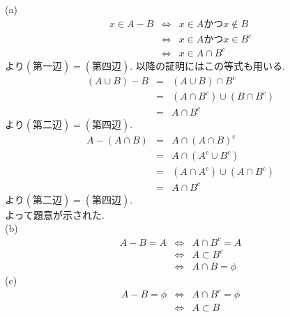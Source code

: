 \documentclass{jsarticle}
\begin{document}
\subsection{}	%
\noindent
(a)\\
\begin{eqnarray*}
	x \in A - B
	&\Leftrightarrow& x \in A かつ x \notin B\\
	&\Leftrightarrow& x \in A かつ x \in B^c\\
	&\Leftrightarrow& x \in A \cap B^c
\end{eqnarray*}
より$(第一辺) = (第四辺)$. 以降の証明にはこの等式も用いる.
\begin{eqnarray*}
	(A \cup B) - B
	&=& (A \cup B) \cap B^c\\
	&=& (A \cap B^c) \cup (B \cap B^c)\\
	&=& A \cap B^c
\end{eqnarray*}
より$(第二辺) = (第四辺)$.
\begin{eqnarray*}
	A - (A \cap B)
	&=& A \cap (A \cap B)^c\\
	&=& A \cap (A^c \cup B^c)\\
	&=& (A \cap A^c) \cup (A \cap B^c)\\
	&=& A \cap B^c
\end{eqnarray*}
より$(第二辺) = (第四辺)$.\\
よって題意が示された.\\
(b)
\begin{eqnarray*}
	A - B = A
	&\Leftrightarrow& A \cap B^c = A\\
	&\Leftrightarrow& A \subset B^c\\
	&\Leftrightarrow& A \cap B = \phi
\end{eqnarray*}
(c)
\begin{eqnarray*}
	A - B = \phi
	&\Leftrightarrow& A \cap B^c = \phi\\
	&\Leftrightarrow& A \subset B
\end{eqnarray*}
\end{document}
